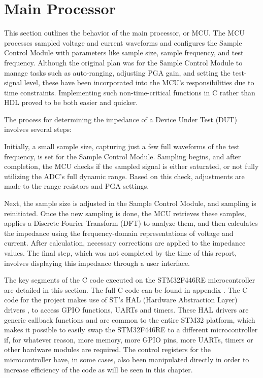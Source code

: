 \section{Main Processor} \label{sec:MCU}

This section outlines the behavior of the main processor, or MCU. The MCU processes sampled voltage and current waveforms and configures the Sample Control Module with parameters like sample size, sample frequency, and test frequency. Although the original plan was for the Sample Control Module to manage tasks such as auto-ranging, adjusting PGA gain, and setting the test-signal level, these have been incorporated into the MCU's responsibilities due to time constraints. Implementing such non-time-critical functions in C rather than HDL proved to be both easier and quicker.

The process for determining the impedance of a Device Under Test (DUT) involves several steps:

Initially, a small sample size, capturing just a few full waveforms of the test frequency, is set for the Sample Control Module. Sampling begins, and after completion, the MCU checks if the sampled signal is either saturated, or not fully utilizing the ADC's full dynamic range. Based on this check, adjustments are made to the range resistors and PGA settings. 

Next, the sample size is adjusted in the Sample Control Module, and sampling is reinitiated. Once the new sampling is done, the MCU retrieves these samples, applies a Discrete Fourier Transform (DFT) to analyze them, and then calculates the impedance using the frequency-domain representations of voltage and current. After calculation, necessary corrections are applied to the impedance values. The final step, which was not completed by the time of this report, involves displaying this impedance through a user interface.

The key segments of the C code executed on the STM32F446RE microcontroller are detailed in this section. The full C code can be found in appendix . The C code for the project makes use of ST's HAL (Hardware Abstraction Layer) drivers \cite{STHAL}, to access GPIO functions, UARTs and timers. These HAL drivers are generic callback functions and are common to the entire STM32 platform, which makes it possible to easily swap the STM32F446RE to a different microcontroller if, for whatever reason, more memory, more GPIO pins, more UARTs, timers or other hardware modules are required. The control registers for the microcontroller have, in some cases, also been manipulated directly in order to increase efficiency of the code as will be seen in this chapter. 





